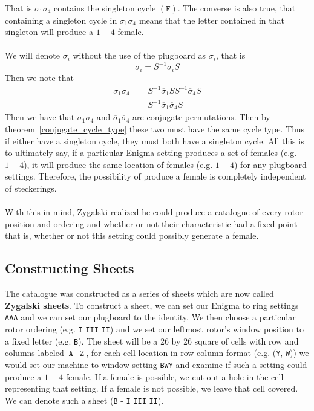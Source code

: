 That is $\sigma_1\sigma_4$ contains the singleton cycle $(\texttt{F})$. The converse is also true, that containing a singleton cycle in $\sigma_1\sigma_4$ means that the letter contained in that singleton will produce a $1-4$ female.
\\\\We will denote $\sigma_i$ without the use of the plugboard as $\overline\sigma_i$, that is
\[
	\sigma_i = S^{-1}\sigma_i S
\]
Then we note that
\begin{align*}
	\sigma_1\sigma_4 & = S^{-1}\overline\sigma_1 SS^{-1} \overline\sigma_4 S \\
	                 & = S^{-1} \overline\sigma_1\overline\sigma_4 S
\end{align*}
Then we have that $\sigma_1\sigma_4$ and $\overline\sigma_1\overline\sigma_4$ are conjugate permutations. Then by theorem~\ref{conjugate_cycle_type} these two must have the same cycle type. Thus if either have a singleton cycle, they must both have a singleton cycle. All this is to ultimately say, if  a particular Enigma setting produces a set of females (e.g. $1-4$), it will produce the same location of females (e.g. $1-4$) for any plugboard settings. Therefore, the possibility of produce a female is completely independent of steckerings.
\\\\With this in mind, Zygalski realized he could produce a catalogue of every rotor position and ordering and whether or not their characteristic had a fixed point -- that is, whether or not this setting could possibly generate a female.

\subsection{Constructing Sheets}
The catalogue was constructed as a series of sheets which are now called {\bf{Zygalski sheets}}. To construct a sheet, we can set our Enigma to ring settings \texttt{AAA} and we can set our plugboard to the identity. We then choose a particular rotor ordering (e.g. \texttt{I} \texttt{III} \texttt{II}) and we set our leftmost rotor's window position to a fixed letter (e.g. \texttt{B}). The sheet will be a $26$ by $26$ square of cells with row and columns labeled $\texttt{A}-\texttt{Z}$, for each cell location in row-column format (e.g. (\texttt{Y}, \texttt{W})) we would set our machine to window setting \texttt{BWY} and examine if such a setting could produce a $1-4$ female. If a female is possible, we cut out a hole in the cell representing that setting. If a female is not possible, we leave that cell covered. We can denote such a sheet (\texttt{B} - \texttt{I} \texttt{III} \texttt{II}).

